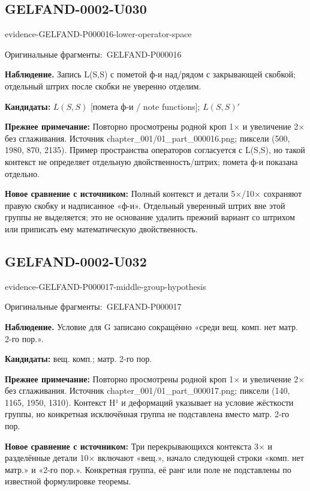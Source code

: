 \documentclass[11pt]{article}
\newcommand{\EvidenceBlock}[4]{%
 \par\smallskip\noindent\begin{minipage}{\linewidth}
 \begin{minipage}[t]{.47\linewidth}\vspace{0pt}\centering
 \csname evidence-#1-#2\endcsname\par
 {\scriptsize\SourceCropCaption\ #1}\par
 \end{minipage}\hfill
 \begin{minipage}[t]{.49\linewidth}\vspace{0pt}\raggedright
 {\small\color{orange!65!black}\textbf{#4} #3}\par
 \end{minipage}
 \end{minipage}\par\smallskip}
\newcommand{\SourceCropCaption}{Оригинальные фрагменты:}\newcommand{\ReadingCaption}{Сомнительное чтение.}\newcommand{\IncompleteCaption}{Неразобранный фрагмент.}\newcommand{\DiagramCaption}{Рисунок и набранное описание.}
\begin{document}
\subsection*{GELFAND-0002-U030}
\EvidenceBlock{GELFAND-P000016}{lower-operator-space}{Запись L(S,S) с пометой ф-и над/рядом с закрывающей скобкой; отдельный штрих после скобки не уверенно отделим.}{Наблюдение.}
\par\smallskip\noindent\textbf{Кандидаты: } \(L(S,S)\) [помета ф-и / note functions]; \(L(S,S)'\)\par
\par\smallskip\noindent\textbf{Прежнее примечание: } Повторно просмотрены родной кроп 1× и увеличение 2× без сглаживания. Источник chapter\_001/01\_part\_000016.png; пиксели (500, 1980, 870, 2135). Пример пространства операторов согласуется с L(S,S), но такой контекст не определяет отдельную двойственность/штрих; помета ф-и показана отдельно.\par
\par\smallskip\noindent\textbf{Новое сравнение с источником: } Полный контекст и детали 5×/10× сохраняют правую скобку и надписанное «ф-и». Отдельный уверенный штрих вне этой группы не выделяется; это не основание удалить прежний вариант со штрихом или приписать ему математическую двойственность.\par

\subsection*{GELFAND-0002-U032}
\EvidenceBlock{GELFAND-P000017}{middle-group-hypothesis}{Условие для G записано сокращённо «среди вещ. комп. нет матр. 2-го пор.».}{Наблюдение.}
\par\smallskip\noindent\textbf{Кандидаты: } вещ. комп.; матр. 2-го пор.\par
\par\smallskip\noindent\textbf{Прежнее примечание: } Повторно просмотрены родной кроп 1× и увеличение 2× без сглаживания. Источник chapter\_001/01\_part\_000017.png; пиксели (140, 1165, 1950, 1310). Контекст H¹ и деформаций указывает на условие жёсткости группы, но конкретная исключённая группа не подставлена вместо матр. 2-го пор.\par
\par\smallskip\noindent\textbf{Новое сравнение с источником: } Три перекрывающихся контекста 3× и разделённые детали 10× включают «вещ.», начало следующей строки «комп. нет матр.» и «2-го пор.». Конкретная группа, её ранг или поле не подставлены по известной формулировке теоремы.\par
\end{document}
